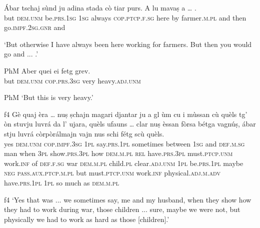 \begin{linenumbers}
	\gll  Ábar tschaj sùnd ju adina stada cò tiar purs. A lu mavaṣ a … .  \\
	but \textsc{dem.unm} be.\textsc{prs.1sg} \textsc{1sg} always \textsc{cop.ptcp.f.sg} here by farmer.\textsc{m.pl} and then go.\textsc{impf.2sg.gnr} and\\
\end{linenumbers}
\medskip
\glt `But otherwise I have always been here working for farmers. But then you would go and ... .'
\medskip

\begin{linenumbers}
	\gll {\ob}PhM{\cb} Aber quei ei fetg grev.    \\
	{} but \textsc{dem.unm} \textsc{cop.prs.3sg} very heavy.\textsc{adj.unm}\\
\end{linenumbers}
\medskip
\glt {\ob}PhM{\cb} `But this is very heavy.'
\medskip

\begin{linenumbers}
	\gll {\ob}f4{\cb} Gè quaj èra … nuṣ ṣchajn magari djantar ju a gl ùm cu i mùssan cù quèls tg’ òn stuvju luvrá da l’ ujara, quèls ufauns … clar nuṣ èssan fòrsa bétga vagnúṣ, ábar stju luvrá còrpòrálmajn vajn nus schi fétg scù quèls.\\
{}	yes \textsc{dem.unm} \textsc{cop.impf.3sg} {}  \textsc{1pl} say.\textsc{prs.1pl} sometimes between \textsc{1sg} and \textsc{def.m.sg} man when \textsc{3pl} show.\textsc{prs.3pl} how \textsc{dem.m.pl} \textsc{rel} have.\textsc{prs.3pl} must.\textsc{ptcp.unm} work.\textsc{inf} of \textsc{def.f.sg} war \textsc{dem.m.pl} child.\textsc{pl} {} clear\textsc{.adj.unm} \textsc{1pl} be.\textsc{prs.1pl} maybe \textsc{neg} \textsc{pass.aux.ptcp.m.pl} but must.\textsc{ptcp.unm} work.\textsc{inf} physical.\textsc{adj.m.adv} have.\textsc{prs.1pl} \textsc{1pl} so much as \textsc{dem.m.pl}\\
\end{linenumbers}
\medskip
\glt {\ob}f4{\cb} `Yes that was ... we sometimes say, me and my husband, when they show how they had to work during war, those children ... sure, maybe we were not, but physically we had to work as hard as those [children].'
\medskip

